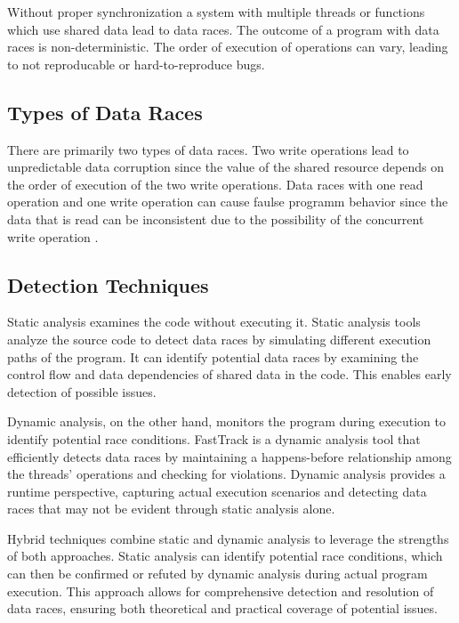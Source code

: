 \documentclass[
fancyheadings, %
%
%
]{stsreprt}
\begin{document}
{Without proper synchronization a system with multiple threads or functions which use shared data lead to data races. The outcome of a program with data races is non-deterministic. The order of execution of operations can vary, leading to not reproducable or hard-to-reproduce bugs. 

\subsection{Types of Data Races}
There are primarily two types of data races. Two write operations lead to unpredictable data corruption since the value of the shared resource depends on the order of execution of the two write operations. Data races with one read operation and one write operation can cause faulse programm behavior since the data that is read can be inconsistent due to the possibility of the concurrent write operation \cite{flanagan2009}.



\subsection{Detection Techniques}

Static analysis examines the code without executing it. Static analysis tools analyze the source code to detect data races by simulating different execution paths of the program. It can identify potential data races by examining the control flow  and data dependencies of shared data in the code. This enables early detection of possible issues.

Dynamic analysis, on the other hand, monitors the program during execution to identify potential race conditions. FastTrack \cite{flanagan2009} is a dynamic analysis tool that efficiently detects data races by maintaining a happens-before relationship among the threads' operations and checking for violations. Dynamic analysis provides a runtime perspective, capturing actual execution scenarios and detecting data races that may not be evident through static analysis alone.

Hybrid techniques combine static and dynamic analysis to leverage the strengths of both approaches. Static analysis can identify potential race conditions, which can then be confirmed or refuted by dynamic analysis during actual program execution. This approach allows for comprehensive detection and resolution of data races, ensuring both theoretical and practical coverage of potential issues.

}
\end{document}

